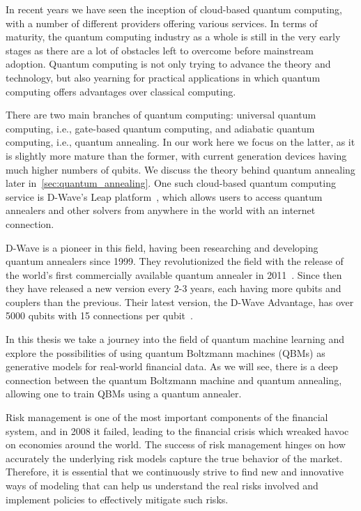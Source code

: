 In recent years we have seen the inception of cloud-based quantum computing, with a number of different providers offering various services.
In terms of maturity, the quantum computing industry as a whole is still in the very early stages as there are a lot of obstacles left to overcome before mainstream adoption.
Quantum computing is not only trying to advance the theory and technology, but also yearning for practical applications in which quantum computing offers advantages over classical computing.

There are two main branches of quantum computing: universal quantum computing, i.e., gate-based quantum computing, and adiabatic quantum computing, i.e., quantum annealing.
In our work here we focus on the latter, as it is slightly more mature than the former, with current generation devices having much higher numbers of qubits.
We discuss the theory behind quantum annealing later in~\cref{sec:quantum_annealing}.
One such cloud-based quantum computing service is D-Wave's Leap platform~\cite{dwave_leap}, which allows users to access quantum annealers and other solvers from anywhere in the world with an internet connection.

D-Wave is a pioneer in this field, having been researching and developing quantum annealers since 1999.
They revolutionized the field with the release of the world's first commercially available quantum annealer in 2011~\cite{zyga_2011}.
Since then they have released a new version every 2-3 years, each having more qubits and couplers than the previous.
Their latest version, the D-Wave Advantage, has over 5000 qubits with 15 connections per qubit~\cite{dwave_advantage}.

In this thesis we take a journey into the field of quantum machine learning and explore the possibilities of using quantum Boltzmann machines (QBMs) as generative models for real-world financial data.
As we will see, there is a deep connection between the quantum Boltzmann machine and quantum annealing, allowing one to train QBMs using a quantum annealer.

Risk management is one of the most important components of the financial system, and in 2008 it failed, leading to the financial crisis which wreaked havoc on economies around the world.
The success of risk management hinges on how accurately the underlying risk models capture the true behavior of the market.
Therefore, it is essential that we continuously strive to find new and innovative ways of modeling that can help us understand the real risks involved and implement policies to effectively mitigate such risks.

